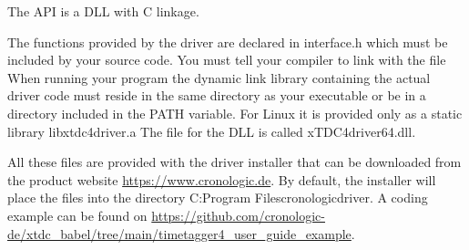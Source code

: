 
The API is a DLL with C linkage.\par

The functions provided by the driver are declared in \textsf{\tu interface.h} 
which must be included by your source code.
You must tell your compiler to link with the file 
When running your program the dynamic link library containing the actual driver code must reside in the same directory as your executable or be in a directory included in the PATH variable. For Linux it is provided only as a static library \textsf{libxtdc4\tu driver.a} 
The file for the DLL is called \textsf{xTDC4\tu driver\tu 64.dll}.

All these files are provided with the driver installer that can be downloaded from the product website \url{https://www.cronologic.de}. 
By default, the installer will place the files into the directory 
\textsf{C:\filesep Program Files\filesep cronologic\filesep \deviceName\filesep driver}. A coding example can be found on \url{https://github.com/cronologic-de/xtdc_babel/tree/main/timetagger4_user_guide_example}.


 
